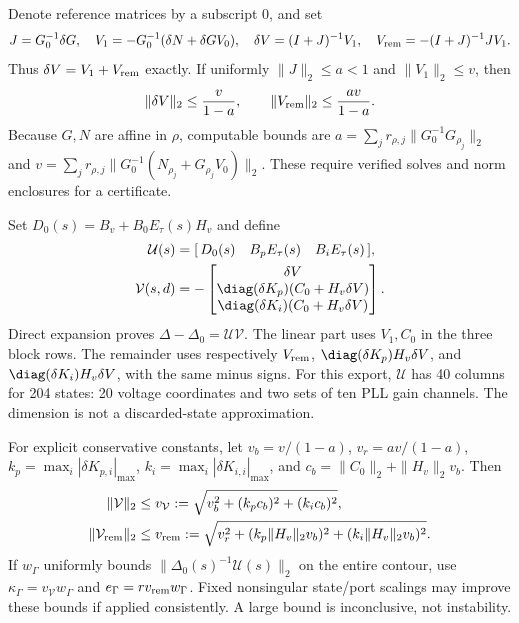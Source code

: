 Denote reference matrices by a subscript $0$, and set
\[
 J=G_0^{-1}\delta G,\quad
 V_1=-G_0^{-1}(\delta N+\delta G V_0),\quad
 \delta V=(I+J)^{-1}V_1,\quad
 V_{\rm rem}=- (I+J)^{-1}J V_1 .
\]
Thus $\delta V=V_1+V_{\rm rem}$ exactly. If uniformly
$\|J\|_2\le a<1$ and $\|V_1\|_2\le v$, then
\begin{equation}
 \|\delta V\|_2\le\frac{v}{1-a},\qquad
 \|V_{\rm rem}\|_2\le\frac{av}{1-a}. \label{eq:voltage-remainder}
\end{equation}
Because $G,N$ are affine in $\rho$, computable bounds are
$a=\sum_j r_{\rho,j}\|G_0^{-1}G_{\rho_j}\|_2$ and
$v=\sum_j r_{\rho,j}\|G_0^{-1}(N_{\rho_j}+G_{\rho_j}V_0)\|_2$.
These require verified solves and norm enclosures for a certificate.

Set $D_0(s)=B_v+B_0E_\tau(s)H_v$ and define
\begin{align}
 \mathcal U(s)&=[\,D_0(s)\quad B_pE_\tau(s)\quad B_iE_\tau(s)\,],\\
 \mathcal V(s,d)&=-
 \begin{bmatrix}
 \delta V\\
 \diag(\delta K_p)(C_0+H_v\delta V)\\
 \diag(\delta K_i)(C_0+H_v\delta V)
 \end{bmatrix}. \label{eq:physical-lowrank}
\end{align}
Direct expansion proves $\Delta-\Delta_0=\mathcal U\mathcal V$.
The linear part uses $V_1,C_0$ in the three block rows.
The remainder uses respectively
$V_{\rm rem}$, $\diag(\delta K_p)H_v\delta V$, and
$\diag(\delta K_i)H_v\delta V$, with the same minus signs.
For this export, $\mathcal U$ has 40 columns for 204 states:
20 voltage coordinates and two sets of ten PLL gain channels.
The dimension is not a discarded-state approximation.

For explicit conservative constants, let
$v_b=v/(1-a)$, $v_r=av/(1-a)$,
$k_p=\max_i|\delta K_{p,i}|_{\max}$,
$k_i=\max_i|\delta K_{i,i}|_{\max}$, and
$c_b=\|C_0\|_2+\|H_v\|_2v_b$.
Then
\begin{align*}
 \|\mathcal V\|_2&\le v_{\mathcal V}
   :=\sqrt{v_b^2+(k_pc_b)^2+(k_ic_b)^2},\\
 \|\mathcal V_{\rm rem}\|_2&\le v_{\rm rem}
   :=\sqrt{v_r^2+(k_p\|H_v\|_2v_b)^2+(k_i\|H_v\|_2v_b)^2}.
\end{align*}
If $w_\Gamma$ uniformly bounds
$\|\Delta_0(s)^{-1}\mathcal U(s)\|_2$ on the entire contour, use
$\kappa_\Gamma=v_{\mathcal V}w_\Gamma$ and
$e_\Gamma=r v_{\rm rem}w_\Gamma$.
Fixed nonsingular state/port scalings may improve these bounds if
applied consistently. A large bound is inconclusive, not instability.

